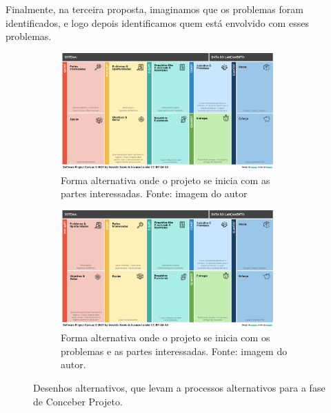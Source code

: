 \documentclass[fontsize=12pt, a4paper,pagesize=auto,toc=listof, ,twoside,chapterprefix=false,appendixprefix=true,open=right]{scrbook}
\begin{document}
Finalmente, na terceira proposta, imaginamos que os problemas foram identificados, e logo depois identificamos quem está envolvido com esses problemas.

\begin{figure}
    \centering
    \begin{subfigure}[b]{\textwidth}
    \centering
    \includegraphics[width=0.9\textwidth]{imagens/alternativa2.png}
    \caption{Forma alternativa onde o projeto se inicia com as partes interessadas. Fonte: imagem do autor}
    \label{fig:alter2}
    \end{subfigure}

    \vspace{1cm}

    \begin{subfigure}[b]{\textwidth}
    \centering
    \includegraphics[width=0.9\textwidth]{imagens/alternativa3.png}
    \caption{Forma alternativa onde o projeto se inicia com os problemas e as partes interessadas. Fonte: imagem do autor.}
    \label{fig:alter3}
    \end{subfigure}
    \caption{Desenhos alternativos, que levam a processos alternativos para a fase de Conceber Projeto.}
    \label{fig:alternativas}
\end{figure}
\end{document}

